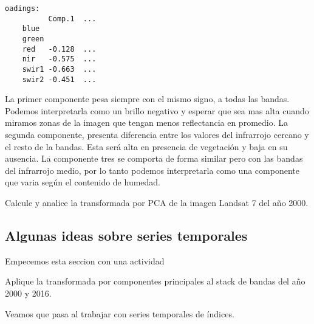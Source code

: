 \begin{exa}
    \begin{Verbatim}[fontsize=\small]
    oadings:
          Comp.1  ...
    blue
    green
    red   -0.128  ...
    nir   -0.575  ...
    swir1 -0.663  ...
    swir2 -0.451  ...
    \end{Verbatim}

    La primer componente pesa siempre con el mismo signo, a
    todas las bandas. Podemos interpretarla como un
    brillo negativo y esperar que sea mas alta cuando miramos zonas de la imagen que
    tengan menos reflectancia en promedio. La segunda componente, presenta diferencia
    entre los valores del infrarrojo cercano y el resto de la bandas. Esta ser\'a alta
    en presencia de vegetaci\'on y baja en su ausencia. La componente tres se comporta
    de forma similar pero con las bandas del infrarrojo medio, por lo tanto podemos
    interpretarla como una componente que varia seg\'un el contenido de humedad.
\end{exa}

\begin{act}
    Calcule y analice la transformada por PCA de la imagen Landsat 7 del año
    2000.
\end{act}

\subsection{Algunas ideas sobre series temporales}

Empecemos esta seccion con una actividad

\begin{act}
    Aplique la transformada por componentes principales al stack de bandas del
    año 2000 y 2016.
\end{act}

Veamos que pasa al trabajar con series temporales de \'indices.

